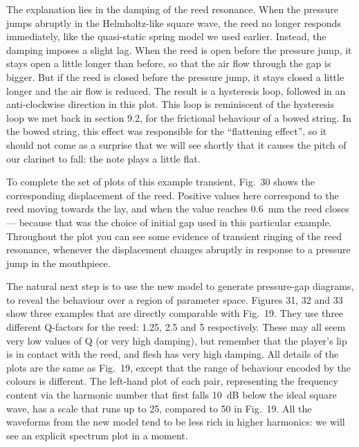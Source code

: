 
  The explanation lies in the damping of the reed resonance. When the pressure 
  jumps abruptly in the Helmholtz-like square wave, the reed no longer responds 
  immediately, like the quasi-static spring model we used earlier. Instead, the 
  damping imposes a slight lag. When the reed is open before the pressure jump, 
  it stays open a little longer than before, so that the air flow through the 
  gap is bigger. But if the reed is closed before the pressure jump, it stays 
  closed a little longer and the air flow is reduced. The result is a 
  hysteresis loop, followed in an anti-clockwise direction in this plot. This 
  loop is reminiscent of the hysteresis loop we met back in section 9.2, for 
  the frictional behaviour of a bowed string. In the bowed string, this effect 
  was responsible for the ``flattening effect'', so it should not come as a 
  surprise that we will see shortly that it causes the pitch of our clarinet to 
  fall: the note plays a little flat. 

  To complete the set of plots of this example transient, Fig.\ 30 shows the 
  corresponding displacement of the reed. Positive values here correspond to 
  the reed moving towards the lay, and when the value reaches 0.6~mm the reed 
  closes — because that was the choice of initial gap used in this particular 
  example. Throughout the plot you can see some evidence of transient ringing 
  of the reed resonance, whenever the displacement changes abruptly in response 
  to a pressure jump in the mouthpiece. 


  The natural next step is to use the new model to generate pressure-gap 
  diagrams, to reveal the behaviour over a region of parameter space. Figures 
  31, 32 and 33 show three examples that are directly comparable with Fig.\ 19. 
  They use three different Q-factors for the reed: 1.25, 2.5 and 5 
  respectively. These may all seem very low values of Q (or very high damping), 
  but remember that the player's lip is in contact with the reed, and flesh has 
  very high damping. All details of the plots are the same as Fig.\ 19, except 
  that the range of behaviour encoded by the colours is different. The 
  left-hand plot of each pair, representing the frequency content via the 
  harmonic number that first falls 10~dB below the ideal square wave, has a 
  scale that runs up to 25, compared to 50 in Fig.\ 19. All the waveforms from 
  the new model tend to be less rich in higher harmonics: we will see an 
  explicit spectrum plot in a moment. 

